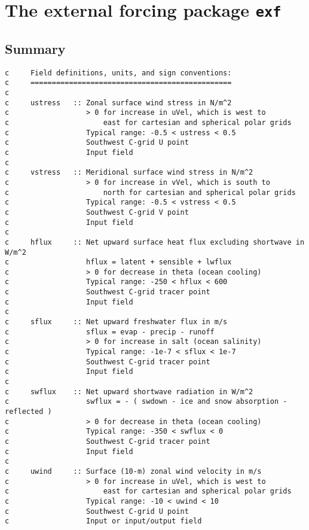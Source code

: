 \section{The external forcing package \texttt{exf}
\label{sectionexf}}

\subsection{Summary}

{\footnotesize
\begin{verbatim}
c     Field definitions, units, and sign conventions:
c     ===============================================
c
c     ustress   :: Zonal surface wind stress in N/m^2
c                  > 0 for increase in uVel, which is west to
c                      east for cartesian and spherical polar grids
c                  Typical range: -0.5 < ustress < 0.5
c                  Southwest C-grid U point
c                  Input field
c
c     vstress   :: Meridional surface wind stress in N/m^2
c                  > 0 for increase in vVel, which is south to
c                      north for cartesian and spherical polar grids
c                  Typical range: -0.5 < vstress < 0.5
c                  Southwest C-grid V point
c                  Input field
c
c     hflux     :: Net upward surface heat flux excluding shortwave in W/m^2
c                  hflux = latent + sensible + lwflux
c                  > 0 for decrease in theta (ocean cooling)
c                  Typical range: -250 < hflux < 600
c                  Southwest C-grid tracer point
c                  Input field
c
c     sflux     :: Net upward freshwater flux in m/s
c                  sflux = evap - precip - runoff
c                  > 0 for increase in salt (ocean salinity)
c                  Typical range: -1e-7 < sflux < 1e-7
c                  Southwest C-grid tracer point
c                  Input field
c
c     swflux    :: Net upward shortwave radiation in W/m^2
c                  swflux = - ( swdown - ice and snow absorption - reflected )
c                  > 0 for decrease in theta (ocean cooling)
c                  Typical range: -350 < swflux < 0
c                  Southwest C-grid tracer point
c                  Input field
c
c     uwind     :: Surface (10-m) zonal wind velocity in m/s
c                  > 0 for increase in uVel, which is west to
c                      east for cartesian and spherical polar grids
c                  Typical range: -10 < uwind < 10
c                  Southwest C-grid U point
c                  Input or input/output field

\end{verbatim}}
